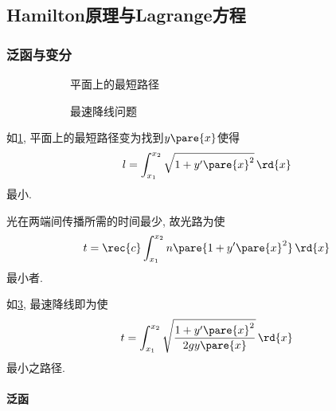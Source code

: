 \documentclass[../LectureNotes.tex]{subfiles}
\begin{document}



\subsection{Hamilton原理与Lagrange方程} %
\label{sub:hamilton原理与lagrange方程}

\subsubsection{泛函与变分} %
\label{ssub:泛函与变分}

\begin{figure}[ht]
    \centering
    \begin{subfigure}[b]{.47\textwidth}
        \centering
        \caption{平面上的最短路径}
        \label{fig:平面上的最短路径}
    \end{subfigure}
    \begin{subfigure}[b]{.47\textwidth}
        \centering
        \caption{最速降线问题}
        \label{fig:最速降线问题}
    \end{subfigure}
    \caption{}
\end{figure}
\begin{ex}[平面上的最短路径]
    \label{ex:平面上的最短路径}
    如\cref{fig:平面上的最短路径}, 平面上的最短路径变为找到$y\pare{x}$使得
    \[ l = \int_{x_1}^{x_2} \sqrt{1+y'\pare{x}^2}\,\rd{x} \]
    最小.
\end{ex}
\begin{ex}[Fermat原理]
    \label{ex:Fermat原理}
    光在两端间传播所需的时间最少, 故光路为使
    \[ t = \rec{c} \int_{x_1}^{x_2} n\pare{1+y'\pare{x}^2}\,\rd{x} \]
    最小者.
\end{ex}
\begin{ex}[最速降线问题]
    \label{ex:最速降线问题}
    如\cref{fig:最速降线问题}, 最速降线即为使
    \[ t = \int_{x_1}^{x_2} \sqrt{\frac{1+y'\pare{x}^2}{2gy\pare{x}}}\,\rd{x} \]
    最小之路径.
\end{ex}


\paragraph{泛函} %
\label{par:泛函}
\end{document}
